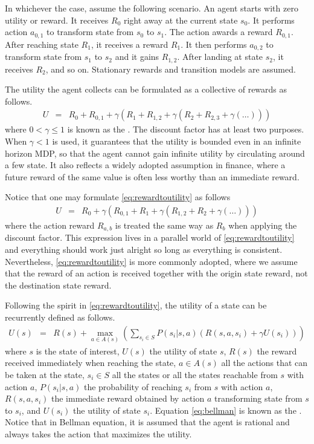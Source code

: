 In whichever the case, assume the following scenario. An agent starts with zero utility or reward. It receives $R_0$ right away at the current state $s_0$. It performs action $a_{0,1}$ to transform state from $s_0$ to $s_1$. The action awards a reward $R_{0,1}$. After reaching state $R_1$, it receives a reward $R_1$. It then performs $a_{0,2}$ to transform state from $s_1$ to $s_2$ and it gains $R_{1,2}$. After landing at state $s_2$, it receives $R_2$, and so on. Stationary rewards and transition models are assumed.

The utility the agent collects can be formulated as a collective of rewards as follows.
\begin{eqnarray}
	U &=& R_0 + R_{0,1} + \gamma \left(R_1 + R_{1,2} + \gamma \left(R_2 + R_{2,3} + \gamma(\ldots)\right)\right) \label{eq:rewardtoutility}
\end{eqnarray}
where $0 < \gamma \leq 1$ is known as the . The discount factor has at least two purposes. When $\gamma < 1$ is used, it guarantees that the utility is bounded even in an infinite horizon MDP, so that the agent cannot gain infinite utility by circulating around a few state. It also reflects a widely adopted assumption in finance, where a future reward of the same value is often less worthy than an immediate reward.

Notice that one may formulate \eqref{eq:rewardtoutility} as follows
\begin{eqnarray}
	U &=& R_0 + \gamma \left(R_{0,1} + R_1 + \gamma \left(R_{1,2} + R_2 + \gamma(\ldots)\right)\right) \nonumber
\end{eqnarray}
where the action reward $R_{a,b}$ is treated the same way as $R_{b}$ when applying the discount factor. This expression lives in a parallel world of \eqref{eq:rewardtoutility} and everything should work just alright so long as everything is consistent. Nevertheless, \eqref{eq:rewardtoutility} is more commonly adopted, where we assume that the reward of an action is received together with the origin state reward, not the destination state reward.

Following the spirit in \eqref{eq:rewardtoutility}, the utility of a state can be recurrently defined as follows.
\begin{eqnarray}
	U(s) &=& R(s) + \max_{a\in A(s)}\left(\sum_{s_i \in S} P(s_i|s,a)\left(R(s,a,s_i) + \gamma U(s_i)\right)\right) \label{eq:bellman}
\end{eqnarray}
where $s$ is the state of interest, $U(s)$ the utility of state $s$, $R(s)$ the reward received immediately when reaching the state, $a\in A(s)$ all the actions that can be taken at the state, $s_i \in S$ all the states or all the states reachable from $s$ with action $a$, $P(s_i|s,a)$ the probability of reaching $s_i$ from $s$ with action $a$, $R(s,a,s_i)$ the immediate reward obtained by action $a$ transforming state from $s$ to $s_i$, and $U(s_i)$ the utility of state $s_i$. Equation \eqref{eq:bellman} is known as the . Notice that in Bellman equation, it is assumed that the agent is rational and always takes the action that maximizes the utility.

